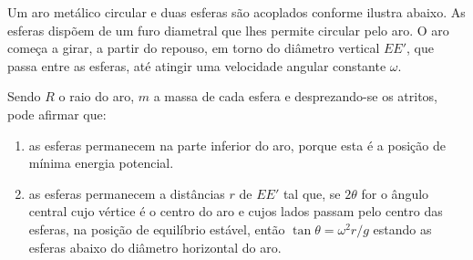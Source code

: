 \begin{exemplo}\label{exemplo_newton_frcptex03}


Um aro metálico circular e duas esferas são acoplados conforme ilustra abaixo. As esferas dispõem de um furo diametral que lhes permite circular pelo aro. O aro começa a girar, a partir do repouso, em torno do diâmetro vertical $EE'$, que passa entre as esferas, até atingir uma velocidade angular constante $\omega$. 


\begin{center}
\end{center}





Sendo $R$ o raio do aro, $m$ a massa de cada esfera e desprezando-se os atritos, pode afirmar que:


\begin{enumerate}
    \item [a)]as esferas permanecem na parte inferior do aro, porque esta é a posição de mínima energia potencial.

    \item [b)]as esferas permanecem a distâncias $r$ de $EE'$ tal que, se $2\theta$ for o ângulo central cujo vértice é o centro do aro e cujos lados passam pelo centro das esferas, na posição de equilíbrio estável, então $\tan \theta = \omega^2 r/g$ estando as esferas abaixo do diâmetro horizontal do aro.


\end{enumerate}
\end{exemplo}
